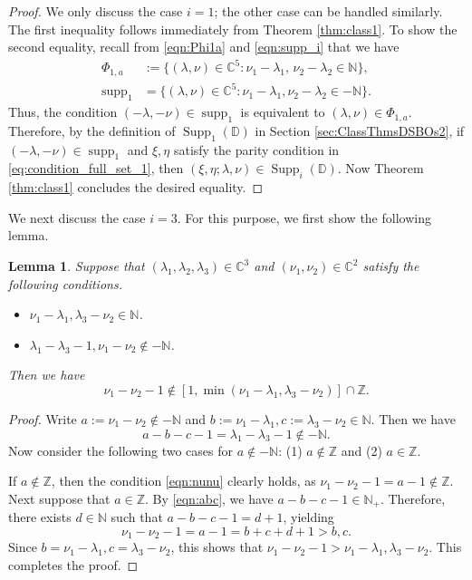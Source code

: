 \documentclass[a4paper,11pt,reqno]{amsart}
\newcommand{\DD}{\mathbb{D}}
\newcommand{\0}{{\bf 0}}
\newcommand{\N}{\mathbb{N}}
\newcommand{\Z}{\mathbb{Z}}
\newcommand{\C}{\mathbb{C}}
\newcommand{\1}{{\bf 1}}
\DeclareMathOperator{\supp}{supp}
\DeclareMathOperator{\Supp}{Supp}
\theoremstyle{plain}
\newtheorem{lemma}[equation]{Lemma}
\theoremstyle{definition}
\numberwithin{equation}{section}
\theoremstyle{definition}
\begin{document}
\begin{proof}
We only discuss the case $i=1$; the other case can be handled similarly.
The first inequality follows immediately from Theorem \ref{thm:class1}.
To show the second equality,
recall from \eqref{eqn:Phi1a} and \eqref{eqn:supp_i} that we have 
\begin{align*}
\Phi_{1,a} &:= \{(\lambda, \nu) \in \C^5: \nu_1-\lambda_1,\, \nu_2-\lambda_2 \in \N\},\\
\supp_{1} &= \{(\lambda, \nu) \in \C^5: \nu_1-\lambda_1,\nu_2-\lambda_2 \in -\N\}.
\end{align*}
Thus, the condition $(-\lambda, -\nu) \in \supp_{1}$ is equivalent to
$(\lambda, \nu) \in \Phi_{1,a}$. 
Therefore, by the definition of $\Supp_1(\DD)$ 
in Section \ref{sec:ClassThmsDSBOs2}, 
if $(-\lambda, -\nu) \in \supp_{1}$ and 
$\xi,\eta$ satisfy the parity condition in \eqref{eq:condition_full_set_1}, 
then $(\xi,\eta;\lambda,\nu) \in \Supp_i(\DD)$.
Now Theorem \ref{thm:class1} concludes the desired equality.
\end{proof}

We next discuss the case $i=3$. For this purpose, we first show the following lemma.

\begin{lemma}\label{lem:nunu}
Suppose that $(\lambda_1,\lambda_2,\lambda_3)\in \C^3$ 
and $(\nu_1,\nu_2) \in \C^2$ satisfy the following conditions.
\vskip 0.1in

\begin{itemize}

\item $\nu_1-\lambda_1, \lambda_3-\nu_2 \in \N$.
\vskip 0.1in

\item $\lambda_1-\lambda_3-1,\nu_1-\nu_2 \notin -\N$.
\vskip 0.1in
\end{itemize}
Then we have 
\begin{equation}\label{eqn:nunu}
\nu_1-\nu_2-1 \notin [1, \min(\nu_1-\lambda_1,\lambda_3-\nu_2)]\cap \Z.
\end{equation}

\end{lemma}

\begin{proof}
Write 
$a:=\nu_1-\nu_2 \notin -\N$ and 
$b:=\nu_1-\lambda_1, c:=\lambda_3-\nu_2 \in \N$.
Then we have
\begin{equation}\label{eqn:abc}
a-b-c-1=
\lambda_1-\lambda_3-1 \notin -\N.
\end{equation}
Now consider the following two cases for $a \notin -\N$:
(1) $a \notin \Z$ and (2) $a \in \Z$. 

If $a \notin \Z$, then the condition \eqref{eqn:nunu} clearly holds,
as $\nu_1-\nu_2-1=a-1 \notin \Z$.
Next  suppose that $a \in \Z$.
By \eqref{eqn:abc}, we have
$a-b-c-1 \in \N_+$.
Therefore, there exists $d \in \N$ such that 
$a-b-c-1=d+1$, yielding
\begin{equation*}
\nu_1-\nu_2-1=a-1=b+c+d+1>b, c.
\end{equation*}
Since $b=\nu_1-\lambda_1, c=\lambda_3-\nu_2$, this shows that 
$\nu_1-\nu_2-1 > \nu_1-\lambda_1, \lambda_3-\nu_2$.
This completes the proof.
\end{proof}
\end{document}
